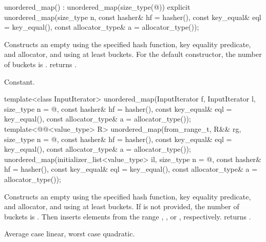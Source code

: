 %
\begin{itemdecl}
unordered_map() : unordered_map(size_type(@\seebelow@)) { }
explicit unordered_map(size_type n,
                       const hasher& hf = hasher(),
                       const key_equal& eql = key_equal(),
                       const allocator_type& a = allocator_type());
\end{itemdecl}

\begin{itemdescr}
\pnum
\effects
Constructs an empty  using the
specified hash function, key equality predicate, and allocator, and
using at least  buckets.  For the default constructor,
the number of buckets is .
 returns .

\pnum
\complexity
Constant.
\end{itemdescr}

%
\begin{itemdecl}
template<class InputIterator>
  unordered_map(InputIterator f, InputIterator l,
                size_type n = @\seebelow@,
                const hasher& hf = hasher(),
                const key_equal& eql = key_equal(),
                const allocator_type& a = allocator_type());
template<@@<value_type> R>
  unordered_map(from_range_t, R&& rg,
                size_type n = @\seebelow@,
                const hasher& hf = hasher(),
                const key_equal& eql = key_equal(),
                const allocator_type& a = allocator_type());
unordered_map(initializer_list<value_type> il,
              size_type n = @\seebelow@,
              const hasher& hf = hasher(),
              const key_equal& eql = key_equal(),
              const allocator_type& a = allocator_type());
\end{itemdecl}

\begin{itemdescr}
\pnum
\effects
Constructs an empty  using the
specified hash function, key equality predicate, and allocator, and
using at least  buckets. If  is not
provided, the number of buckets is . Then
inserts elements from the range , , or ,
respectively.
 returns .

\pnum
\complexity
Average case linear, worst case quadratic.
\end{itemdescr}

